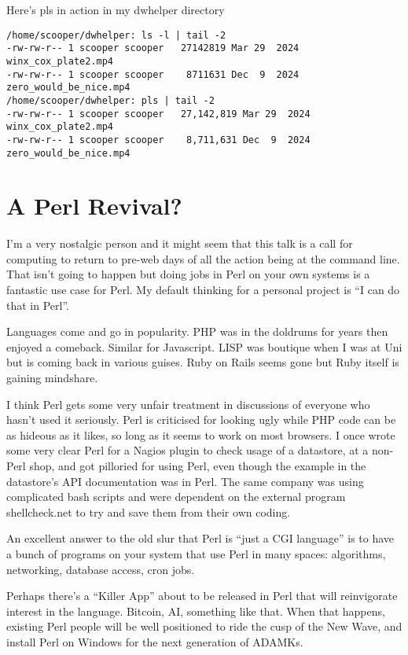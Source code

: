\documentclass{article}
\begin{document}
Here's pls in action in my dwhelper directory
\begin{verbatim}
/home/scooper/dwhelper: ls -l | tail -2
-rw-rw-r-- 1 scooper scooper   27142819 Mar 29  2024 winx_cox_plate2.mp4
-rw-rw-r-- 1 scooper scooper    8711631 Dec  9  2024 zero_would_be_nice.mp4
/home/scooper/dwhelper: pls | tail -2
-rw-rw-r-- 1 scooper scooper   27,142,819 Mar 29  2024 winx_cox_plate2.mp4
-rw-rw-r-- 1 scooper scooper    8,711,631 Dec  9  2024 zero_would_be_nice.mp4
\end{verbatim}

\section{A Perl Revival?}

I'm a very nostalgic person and it might seem that this talk is a call
for computing to return to pre-web days of all the action being at the
command line. That isn't going to happen but doing jobs in Perl on
your own systems is a fantastic use case for Perl. My default thinking
for a personal project is ``I can do that in Perl''.

Languages come and go in popularity. PHP was in the doldrums for years
then enjoyed a comeback. Similar for Javascript. LISP was boutique
when I was at Uni but is coming back in various guises. Ruby on Rails
seems gone but Ruby itself is gaining mindshare.

I think Perl gets some very unfair treatment in discussions of
everyone who hasn't used it seriously. Perl is criticised for looking
ugly while PHP code can be as hideous as it likes, so long as it seems
to work on most browsers. I once wrote some very clear Perl for a
Nagios plugin to check usage of a datastore, at a non-Perl shop, and
got pilloried for using Perl, even though the example in the
datastore's API documentation was in Perl. The same company was using
complicated bash scripts and were dependent on the external program
shellcheck.net to try and save them from their own coding.

An excellent answer to the old slur that Perl is ``just a CGI
language'' is to have a bunch of programs on your system that use Perl
in many spaces: algorithms, networking, database access, cron jobs.

Perhaps there's a ``Killer App'' about to be released in Perl that
will reinvigorate interest in the language. Bitcoin, AI, something
like that. When that happens, existing Perl people will be well
positioned to ride the cusp of the New Wave, and install Perl on
Windows for the next generation of ADAMKs.
\end{document}
